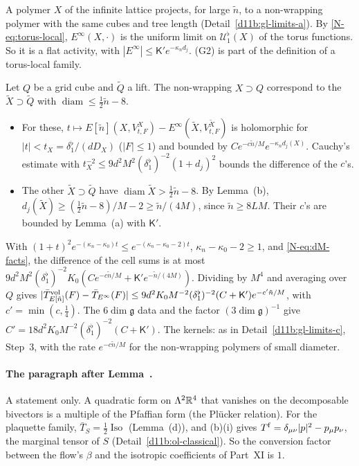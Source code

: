\begin{step}[(d)]
A polymer $X$ of the infinite lattice projects, for large $\tilde n$, to a non-wrapping polymer with the same cubes and tree length (Detail~\ref{d11b:gl-limits-a}). By \eqref{N-eq:torus-local}, $E^\infty(X,\cdot)$ is the uniform limit on $\mathcal U^\flat_1(X)$ of the torus functions. So it is a flat activity, with $|E^\infty|\le\mathsf K'e^{-\kappa_nd_j}$. (G2) is part of the definition of a torus-local family.

Let $Q$ be a grid cube and $\tilde Q$ a lift. The non-wrapping $X\supset Q$ correspond to the $\tilde X\supset\tilde Q$ with $\operatorname{diam}\le\frac12\tilde n-8$.
\begin{itemize}
\item For these, $t\mapsto E[\tilde n](X,V^X_{t,F})-E^\infty(\tilde X,V^{\tilde X}_{t,F})$ is holomorphic for $|t|<t_X=\delta_1^\flat/(dD_X)$ ($|F|\le1$) and bounded by $Ce^{-c\tilde n/M}e^{-\kappa_nd_j(X)}$. Cauchy's estimate with $t_X^{-2}\le9d^2M^2(\delta_1^\flat)^{-2}(1+d_j)^2$ bounds the difference of the $c$'s.
\item The other $\tilde X\supset\tilde Q$ have $\operatorname{diam}\tilde X>\frac12\tilde n-8$. By Lemma~(b), $d_j(\tilde X)\ge(\frac12\tilde n-8)/M-2\ge\tilde n/(4M)$, since $\tilde n\ge8LM$. Their $c$'s are bounded by Lemma~(a) with $\mathsf K'$.
\end{itemize}
With $(1+t)^2e^{-(\kappa_n-\kappa_0)t}\le e^{-(\kappa_n-\kappa_0-2)t}$, $\kappa_n-\kappa_0-2\ge1$, and \eqref{N-eq:dM-facts}, the difference of the cell sums is at most $9d^2M^2(\delta_1^\flat)^{-2}K_0(Ce^{-c\tilde n/M}+\mathsf K'e^{-\tilde n/(4M)})$. Dividing by $M^4$ and averaging over $Q$ gives $|\bar T^{\rm vol}_{E[\tilde n]}(F)-\bar T_{E^\infty}(F)|\le9d^2K_0M^{-2}(\delta_1^\flat)^{-2}(C+\mathsf K')e^{-c'\tilde n/M}$, with $c'=\min(c,\frac14)$. The $6\dim\mathfrak g$ data and the factor $(3\dim\mathfrak g)^{-1}$ give $C'=18d^2K_0M^{-2}(\delta_1^\flat)^{-2}(C+\mathsf K')$. The kernels: as in Detail~\ref{d11b:gl-limits-c}, Step~3, with the rate $e^{-c\tilde n/M}$ for the non-wrapping polymers of small diameter.
\end{step}

\paragraph{The paragraph after Lemma~.} A statement only. A quadratic form on $\Lambda^2\mathbb R^4$ that vanishes on the decomposable bivectors is a multiple of the Pfaffian form (the Plücker relation). For the plaquette family, $\bar T_S=\frac12\operatorname{Iso}$ (Lemma~(d)), and (b)(i) gives $T^{\rm f}=\delta_{\mu\nu}|p|^2-p_\mu p_\nu$, the marginal tensor of $S$ (Detail~\ref{d11b:ol-classical}). So the conversion factor between the flow's $\beta$ and the isotropic coefficients of Part~XI is $1$.


